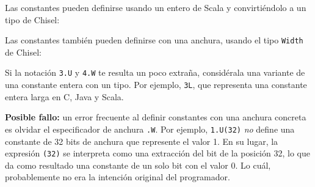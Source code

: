 \documentclass[%
    10pt,
    headinclude, footinclude=false,
    openright, %
    notitlepage,
    cleardoublepage=empty,
    headsepline,
    numbers=noenddot,
    bibliography=totoc, index=totoc,
    ]{scrbook}
\newcommand{\code}[1]{{\lstinline[basicstyle=\small\ttfamily]{#1}}}
\begin{document}



\noindent Las constantes pueden definirse usando un entero de Scala y convirtiéndolo a un tipo de Chisel:



\noindent Las constantes también pueden definirse con una anchura, usando el tipo \code{Width} de Chisel:



\noindent Si la notación \code{3.U} y \code{4.W} te resulta un poco extraña, considérala una variante de una constante
entera con un tipo. Por ejemplo, \code{3L}, que representa una constante entera larga en C, Java y Scala.


\textbf{Posible fallo:} un error frecuente al definir constantes con una anchura concreta es olvidar el
especificador de anchura \code{.W}. Por ejemplo, \code{1.U(32)} \emph{no} define una constante de 32 bits de anchura
que represente el valor 1.
En su lugar, la expresión \code{(32)} se interpreta como una extracción del bit de la posición 32, lo que da como
resultado una constante de un solo bit con el valor 0. Lo cuál, probablemente no era la intención original del programador.

\end{document}
